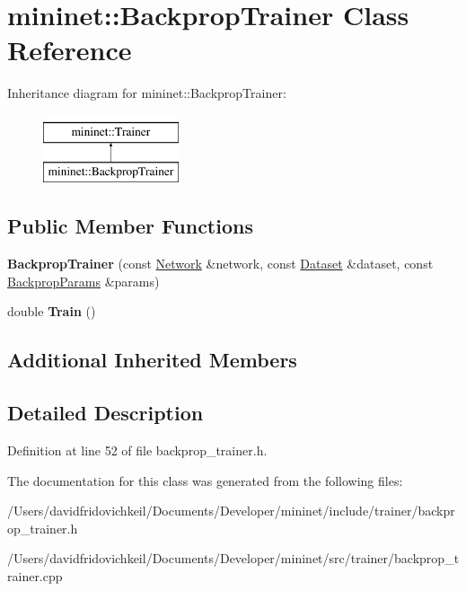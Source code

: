 \hypertarget{classmininet_1_1_backprop_trainer}{}\section{mininet\+:\+:Backprop\+Trainer Class Reference}
\label{classmininet_1_1_backprop_trainer}
Inheritance diagram for mininet\+:\+:Backprop\+Trainer\+:\begin{figure}[H]
\begin{center}
\leavevmode
\includegraphics[height=2.000000cm]{classmininet_1_1_backprop_trainer}
\end{center}
\end{figure}
\subsection*{Public Member Functions}
\begin{DoxyCompactItemize}
\item 
\hypertarget{classmininet_1_1_backprop_trainer_a8cbf43d95c557921f1240b89e44b2da8}{}\label{classmininet_1_1_backprop_trainer_a8cbf43d95c557921f1240b89e44b2da8} 
{\bfseries Backprop\+Trainer} (const \hyperlink{classmininet_1_1_network}{Network} \&network, const \hyperlink{classmininet_1_1_dataset}{Dataset} \&dataset, const \hyperlink{structmininet_1_1_backprop_params}{Backprop\+Params} \&params)
\item 
\hypertarget{classmininet_1_1_backprop_trainer_a359c5b8e3d0a283aad185c2ba3d5ab0d}{}\label{classmininet_1_1_backprop_trainer_a359c5b8e3d0a283aad185c2ba3d5ab0d} 
double {\bfseries Train} ()
\end{DoxyCompactItemize}
\subsection*{Additional Inherited Members}


\subsection{Detailed Description}


Definition at line 52 of file backprop\+\_\+trainer.\+h.



The documentation for this class was generated from the following files\+:\begin{DoxyCompactItemize}
\item 
/\+Users/davidfridovichkeil/\+Documents/\+Developer/mininet/include/trainer/backprop\+\_\+trainer.\+h\item 
/\+Users/davidfridovichkeil/\+Documents/\+Developer/mininet/src/trainer/backprop\+\_\+trainer.\+cpp\end{DoxyCompactItemize}
